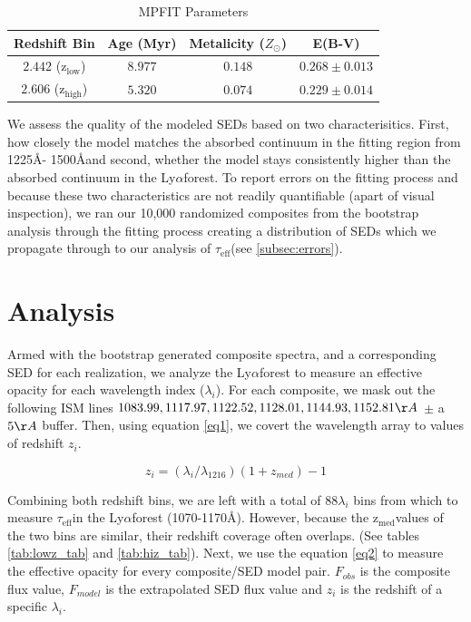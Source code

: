 \documentclass[preprint2,times,tighten]{aastex6}
\newcommand{\teff}{$\tau_\mathrm{eff}$\space}
\newcommand{\lya}{Ly$\alpha$\space}
\newcommand{\zem}{$\mathrm{z_{med}}$\space}
\newcommand{\hiz}{$\mathrm{z_{high}}$\space}
\newcommand{\loz}{$\mathrm{z_{low}}$\space}
\begin{document}
\begin{table}[ht]
\begin{center}
\caption{MPFIT Parameters}
\label{tab:params}
\vskip0.1in
\begin{tabular}{cccc}
\hline
\hline
Redshift Bin & Age (Myr) & Metalicity ($Z_\odot$) & E(B-V)\\
\hline
$2.442$ (\loz) & $8.977$ & $0.148$ & $0.268 \pm 0.013$\\
$2.606$ (\hiz) & $5.320$ & $0.074$ & $0.229 \pm 0.014$\\
\hline
\end{tabular}
\end{center}
\end{table}

We assess the quality of the modeled SEDs based on two characterisitics. First, how closely the model matches the absorbed continuum in the fitting region from 1225\AA - 1500\AA\space and second, whether the model stays consistently higher than the absorbed continuum in the \lya forest. To report errors on the fitting process and because these two characteristics are not readily quantifiable (apart of visual inspection), we ran our 10,000 randomized composites from the bootstrap analysis through the fitting process creating a distribution of SEDs which we propagate through to our analysis of \teff (see \ref{subsec:errors}).


\section{Analysis} %
\label{sec:Effective Opacity Measurements}

Armed with the bootstrap generated composite spectra, and a corresponding SED for each realization, we analyze the \lya forest to measure an effective opacity for each wavelength index ($\lambda_{i}$). For each composite, we mask out the following ISM lines $1083.99, 1117.97, 1122.52, 1128.01, 1144.93, 1152.81 \AA$ $\pm$ a $5\AA$ buffer. Then, using equation \ref{eq1}, we covert the wavelength array to values of redshift $z_{i}$.

\begin{equation}
        z_{i} = (\lambda_{i}/\lambda_{1216})(1 + z_{med}) - 1
        \label{eq1}
\end{equation}

Combining both redshift bins, we are left with a total of $88 \lambda_{i}$ bins from which to measure \teff in the \lya forest (1070-1170\AA). However, because the \zem values of the two bins are similar, their redshift coverage often overlaps. (See tables \ref{tab:lowz_tab} and \ref{tab:hiz_tab}). Next, we use the equation \ref{eq2} to measure the effective opacity for every composite/SED model pair. $F_{obs}$ is the composite flux value, $F_{model}$ is the extrapolated SED flux value and $z_{i}$ is the redshift of a specific $\lambda_{i}$.
\end{document}
